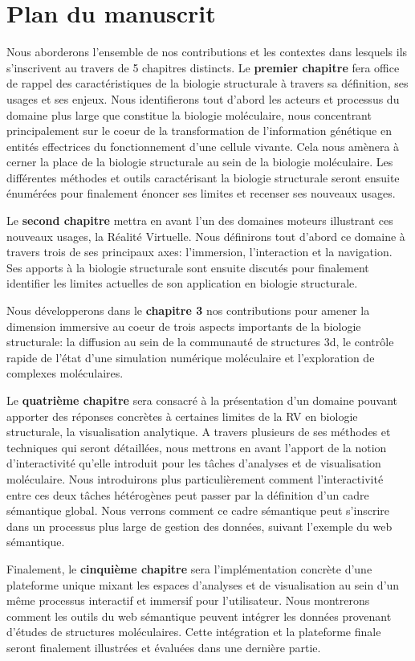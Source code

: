 \section*{Plan du manuscrit}

Nous aborderons l'ensemble de nos contributions et les contextes dans lesquels ils s'inscrivent au travers de 5 chapitres distincts. 
Le \textbf{premier chapitre} fera office de rappel des caractéristiques de la biologie structurale à travers sa définition, ses usages et ses enjeux. Nous identifierons tout d'abord les acteurs et processus du domaine plus large que constitue la biologie moléculaire, nous concentrant principalement sur le coeur de la transformation de l'information génétique en entités effectrices du fonctionnement d'une cellule vivante. Cela nous amènera à cerner la place de la biologie structurale au sein de la biologie moléculaire. Les différentes méthodes et outils caractérisant la biologie structurale seront ensuite énumérées pour finalement énoncer ses limites et recenser ses nouveaux usages.

Le \textbf{second chapitre} mettra en avant l'un des domaines moteurs illustrant ces nouveaux usages, la Réalité Virtuelle. Nous définirons tout d'abord ce domaine à travers trois de ses principaux axes: l'immersion, l'interaction et la navigation. Ses apports à la biologie structurale sont ensuite discutés pour finalement identifier les limites actuelles de son application en biologie structurale.

Nous développerons dans le \textbf{chapitre 3} nos contributions pour amener la dimension immersive au coeur de trois aspects importants de la biologie structurale: la diffusion au sein de la communauté de structures 3d, le contrôle rapide de l'état d'une simulation numérique moléculaire et l'exploration de complexes moléculaires.

Le \textbf{quatrième chapitre} sera consacré à la présentation d'un domaine pouvant apporter des réponses concrètes à certaines limites de la RV en biologie structurale, la visualisation analytique. A travers plusieurs de ses méthodes et techniques qui seront détaillées, nous mettrons en avant l'apport de la notion d'interactivité qu'elle introduit pour les tâches d'analyses et de visualisation moléculaire. Nous introduirons plus particulièrement comment l'interactivité entre ces deux tâches hétérogènes peut passer par la définition d'un cadre sémantique global. Nous verrons comment ce cadre sémantique peut s'inscrire dans un processus plus large de gestion des données, suivant l'exemple du web sémantique.

Finalement, le \textbf{cinquième chapitre} sera l'implémentation concrète d'une plateforme unique mixant les espaces d'analyses et de visualisation au sein d'un même processus interactif et immersif pour l'utilisateur. Nous montrerons comment les outils du web sémantique peuvent intégrer les données provenant d'études de structures moléculaires. Cette intégration et la plateforme finale seront finalement illustrées et évaluées dans une dernière partie.
